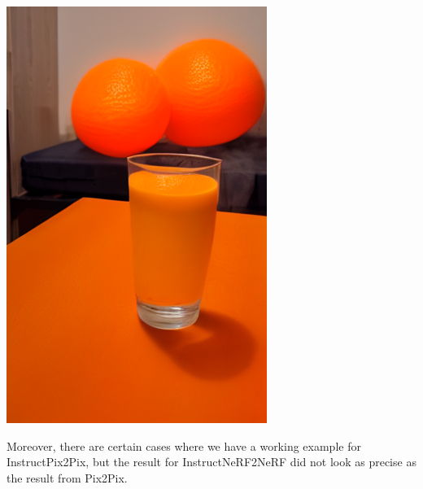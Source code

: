 \documentclass{article}
\begin{document}
\begin{center}
    \begin{tcolorbox}[
                      boxsep=0pt,
                      top=2pt,
                      colback=red!5!white,
                      colframe=red!75!black,
                      center title,
                      autowidth title=turn the water to orange juice
                      ]
        \begin{center}
            \includegraphics[scale=0.2]{images/orangejuicefail.png}
        \end{center}
    \end{tcolorbox}
\end{center}

Moreover, there are certain cases where we have a working example for InstructPix2Pix, but the result for InstructNeRF2NeRF did not look as precise as the result from Pix2Pix.
\end{document}
